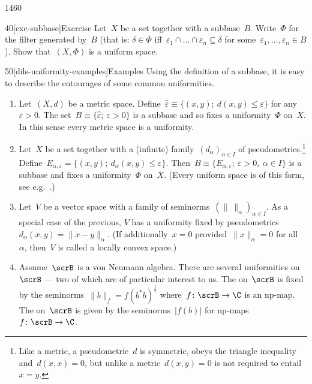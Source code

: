 \begin{parsec}{1460}
\begin{point}{40}[exc-subbase]{Exercise}%
Let~$X$ be a set together with a subbase~$B$.
Write~$\Phi$ for the filter generated by~$B$
    (that is: $\delta \in \Phi$
        iff~$\varepsilon_1 \cap \ldots \cap \varepsilon_n \subseteq \delta$
            for some~$\varepsilon_1, \ldots, \varepsilon_n \in B$).
Show that~$(X,\Phi)$ is a uniform space.
\end{point}
\begin{point}{50}[dils-uniformity-examples]{Examples}%
Using the definition of a subbase, it is easy
to describe the entourages of some common uniformities.
    \begin{enumerate}
        \item
    Let~$(X,d)$ be a metric space.
Define~$\hat\varepsilon \equiv \{(x,y);\ d(x,y) \leq \varepsilon\}$
for any $\varepsilon > 0$.
The set~$B \equiv \{ \hat\varepsilon; \ \varepsilon > 0\}$
is a subbase and so fixes a uniformity~$\Phi$ on~$X$.
In this sense every metric space is a uniformity.
        \item
    Let~$X$ be a set together with a (infinite)
            family~$(d_{\alpha})_{\alpha\in I}$
            of pseudometrics.\footnote{Like a metric,
                a pseudometric~$d$ is symmetric,
                obeys the triangle inequality
                    and~$d(x,x)=0$,
                    but unlike a metric~$d(x,y)=0$
                    is not required to entail~$x=y$.}
    Define~$E_{\alpha,\varepsilon} = \{ (x,y); \ d_\alpha(x,y)
            \leq \varepsilon\}$.
            Then~$B \equiv \{ E_{\alpha,\varepsilon}; \ \varepsilon > 0, \ 
                    \alpha \in I\}$
                    is a subbase and fixes
                    a uniformity~$\Phi$ on~$X$.
(Every uniform space is of this form, see e.g.~\cite[thm.~39.11]{willard}.)
\item
Let~$V$ be a vector space with a
family of seminorms~$(\|\  \|_\alpha)_{\alpha \in I}$.
As a special case of the previous,
 $V$ has a uniformity fixed by
    pseudometrics~$d_\alpha(x,y) = \|x-y\|_\alpha$.
    (If additionally~$x =0$ provided~$\|x\|_\alpha = 0$ for all~$\alpha$,
    then~$V$ is called a locally convex space.)

\item
Assume~$\scrB$ is a von Neumann algebra.
There are several uniformities on~$\scrB$ --- two of which
    are of particular interest to us.
    The  on~$\scrB$
is fixed by the seminorms~$\|b\|_f = f(b^*b)^{\frac{1}{2}}$
        where~$f\colon \scrB \to \C$ is an np-map.
        The  on~$\scrB$
    is given by the seminorms~$|f(b)|$
        for np-maps~$f\colon \scrB \to \C$.


\end{enumerate}
\end{point}
\end{parsec}
